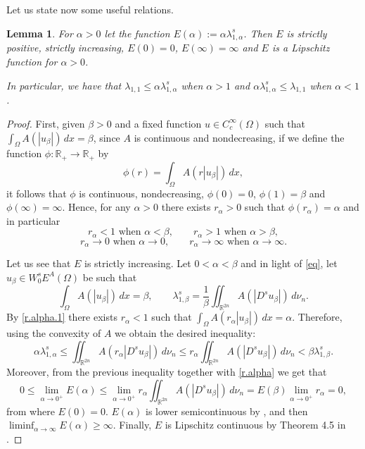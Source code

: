 \documentclass[12pt,reqno]{amsart}
\newtheorem{lem}[thm]{Lemma}
\theoremstyle{definition}
\theoremstyle{remark}
\numberwithin{equation}{section}
\begin{document}
\noindent Let us state now some useful relations.
\begin{lem} \label{lema.e}
For $\alpha>0$ let the function $E(\alpha):=\alpha\lambda_{1,\alpha}^s$. Then $E$ is strictly positive, strictly increasing, $E(0)=0$, $E(\infty)=\infty$ and $E$ is a Lipschitz function for $\alpha>0$.

In particular, we have that $\lambda_{1,1}\leq   \alpha \lambda_{1,\alpha}^s$ when $\alpha>1$ and $\alpha \lambda_{1,\alpha}^s\leq \lambda_{1,1}$ when $\alpha<1$.
\end{lem}
\begin{proof}
First, given $\beta>0$ and a fixed function $u\in C_c^\infty(\Omega)$ such that $\int_\Omega A(|u_\beta|)\,dx =\beta$, since $A$ is continuous and nondecreasing, if we define the function $\phi\colon \mathbb{R}_+ \to \mathbb{R}_+$ by
$$
\phi(r)=\int_\Omega A(r|u_\beta|)\,dx,
$$
it follows that $\phi$ is continuous, nondecreasing, $\phi(0)=0$, $\phi(1)=\beta$ and $\phi(\infty)=\infty$. Hence, for any $\alpha>0$ there exists $r_\alpha>0$ such that $\phi(r_\alpha)=\alpha$ and in particular
\begin{equation} \label{r.alpha.1}
r_\alpha<1 \text{ when } \alpha < \beta, \qquad r_\alpha>1 \text{ when } \alpha>\beta,
\end{equation}
\begin{equation} \label{r.alpha}
r_\alpha\to 0 \text{ when }\alpha\to 0, \qquad  r_\alpha\to \infty \text{ when }\alpha\to\infty.
\end{equation}

Let us see that $E$ is strictly increasing. Let $0<\alpha<\beta$ and in light of \eqref{eq}, let $u_\beta\in W^s_0 E^A(\Omega)$ be such that 
$$
\int_\Omega A(|u_\beta|)\,dx=\beta, \qquad \lambda_{1,\beta}^s = \frac{1}{\beta}\iint_{\mathbb{R}^{2n}} A(|D^s u_\beta|)\,d\nu_n.
$$
By \eqref{r.alpha.1} there exists $r_\alpha<1$ such that $\int_\Omega A(r_\alpha |u_\beta|)\,dx = \alpha$. Therefore, using the convexity of $A$ we obtain the desired inequality:
$$
\alpha\lambda_{1,\alpha}^s \leq \iint_{\mathbb{R}^{2n}} A(r_\alpha |D^s u_\beta|)\,d\nu_n \leq r_\alpha \iint_{\mathbb{R}^{2n}} A(|D^s u_\beta|)\,d\nu_n <  \beta\lambda_{1,\beta}^s.
$$
Moreover, from the previous inequality together with \eqref{r.alpha} we get that
$$
0\leq \lim_{\alpha\to 0^+}E(\alpha) \leq \lim_{\alpha\to 0^+} r_\alpha \iint_{\mathbb{R}^{2n}} A(|D^s u_\beta|)\,d\nu_n = E(\beta)  \lim_{\alpha\to 0^+} r_\alpha =0,
$$
from where $E(0)=0$. $E(\alpha)$ is lower semicontinuous by \cite[Lemma 4.3]{fbs.autov}, and then $\liminf_{\alpha\to \infty} E(\alpha) \geq \infty$.
 Finally, $E$ is Lipschitz continuous by Theorem 4.5 in \cite{fbs.autov}.
\end{proof}
\end{document}
